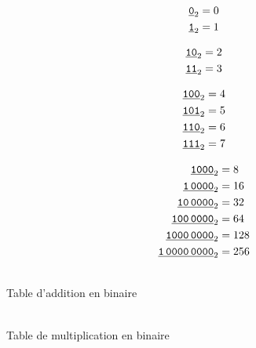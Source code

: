 \begin{minipage}[t]{0.18\linewidth}
\begin{align*}
\underline{\text{\texttt{0}}}_{2} &= 0\\
\underline{\text{\texttt{1}}}_{2} &= 1\\
\end{align*}
\end{minipage}
\begin{minipage}[t]{0.18\linewidth}
\begin{align*}
\underline{\text{\texttt{10}}}_{2} &= 2\\
\underline{\text{\texttt{11}}}_{2} &= 3\\
\end{align*}
\end{minipage}
\begin{minipage}[t]{0.18\linewidth}
\begin{align*}  
\underline{\text{\texttt{100}}}_{2} &= 4\\
\underline{\text{\texttt{101}}}_{2} &= 5\\
\underline{\text{\texttt{110}}}_{2} &= 6\\
\underline{\text{\texttt{111}}}_{2} &= 7\\
\end{align*}
\end{minipage}
\begin{minipage}[t]{0.18\linewidth}
\begin{align*}
\underline{\text{\texttt{1000}}}_{2} &= 8\\
\underline{\text{\texttt{1\,0000}}}_{2} &= 16\\
\underline{\text{\texttt{10\,0000}}}_{2} &= 32\\
\underline{\text{\texttt{100\,0000}}}_{2} &= 64\\
\underline{\text{\texttt{1000\,0000}}}_{2} &= 128\\
\underline{\text{\texttt{1\,0000\,0000}}}_{2} &= 256\\
\end{align*}
\end{minipage}



  \begin{minipage}{0.5\textwidth}
  \begin{center}
    \\
  Table d'addition en binaire
  \end{center}
  \end{minipage}
  \begin{minipage}{0.5\textwidth}
  \begin{center}
    \\
  Table de multiplication en binaire
  \end{center}
  \end{minipage}


